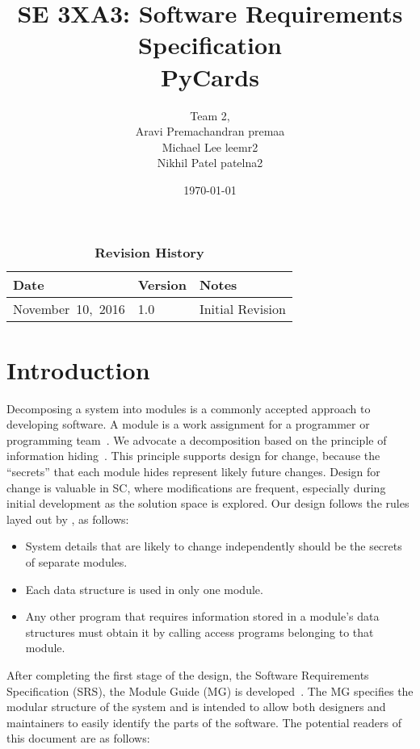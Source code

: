 \documentclass[12pt, titlepage]{article}
\title{SE 3XA3: Software Requirements Specification\\PyCards}
\author{Team 2,
		\\ Aravi Premachandran premaa
		\\ Michael Lee leemr2
		\\ Nikhil Patel patelna2
}
\date{\today}
\begin{document}
	\maketitle
	\tableofcontents
	\listoftables
	\listoffigures
	\begin{table}[bp]
		\caption{\bf Revision History}
		\begin{tabularx}{\textwidth}{p{4cm}p{2cm}X}
			\toprule {\bf Date} & {\bf Version} & {\bf Notes}\\
			\midrule
			\mbox{November 10, 2016} & 1.0 & Initial Revision\\
			\bottomrule
		\end{tabularx}
	\end{table}
	\newpage
	\section{Introduction}
	Decomposing a system into modules is a commonly accepted approach to 
	developing software.  A module is a work assignment for a programmer or 
	programming team~\citep{ParnasEtAl1984}.  We advocate a decomposition
	based on the principle of information hiding~\citep{Parnas1972a}.  This
	principle supports design for change, because the ``secrets'' that each 
	module hides represent likely future changes.  Design for change is 
	valuable in SC, where modifications are frequent, especially during initial 
	development as the solution space is explored. Our design follows the rules 
	layed out by \citet{ParnasEtAl1984}, as follows:
	\begin{itemize}
	\item System details that are likely to change independently should be the 
	secrets of separate modules.
	\item Each data structure is used in only one module.
	\item Any other program that requires information stored in a module's data 
	structures must obtain it by calling access programs belonging to that 
	module.
	\end{itemize}
	After completing the first stage of the design, the Software Requirements
	Specification (SRS), the Module Guide (MG) is 
	developed~\citep{ParnasEtAl1984}. 
	The MG specifies the modular structure of the system and is intended to 
	allow both designers and maintainers to easily identify the parts of the 
	software.  The potential readers of this document are as follows:
\end{document}
